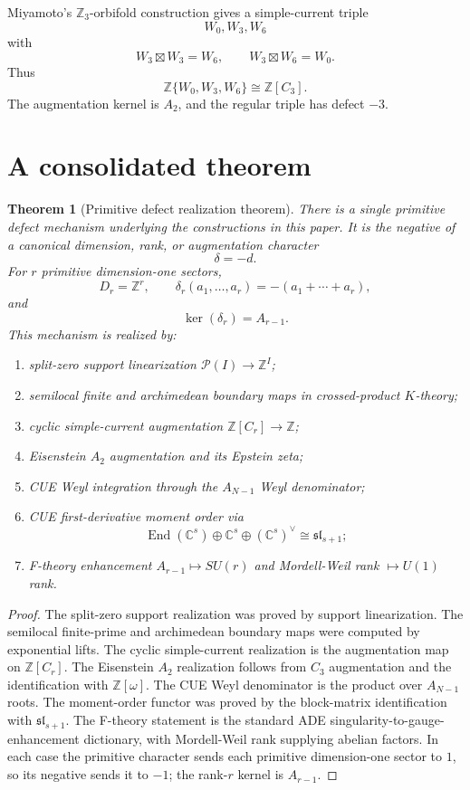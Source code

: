 \documentclass[11pt]{article}
\newtheorem{theorem}{Theorem}[section]
\DeclareMathOperator{\End}{End}
\newcommand{\ZZ}{\mathbb Z}
\newcommand{\CC}{\mathbb C}
\begin{document}
Miyamoto's $\ZZ_3$-orbifold construction gives a simple-current triple
\[
        W_0,W_3,W_6
\]
with
\[
        W_3\boxtimes W_3=W_6,
        \qquad
        W_3\boxtimes W_6=W_0.
\]
Thus
\[
        \ZZ\{W_0,W_3,W_6\}\cong\ZZ[C_3].
\]
The augmentation kernel is $A_2$, and the regular triple has defect $-3$.

\section{A consolidated theorem}

\begin{theorem}[Primitive defect realization theorem]
There is a single primitive defect mechanism underlying the constructions in this paper.  It is the negative of a canonical dimension, rank, or augmentation character
\[
        \delta=-d.
\]
For $r$ primitive dimension-one sectors,
\[
        D_r=\ZZ^r,
        \qquad
        \delta_r(a_1,\ldots,a_r)=-(a_1+\cdots+a_r),
\]
and
\[
        \ker(\delta_r)=A_{r-1}.
\]
This mechanism is realized by:
\begin{enumerate}[label=(\roman*)]
\item split-zero support linearization $\mathcal P(I)\to\ZZ^I$;
\item semilocal finite and archimedean boundary maps in crossed-product $K$-theory;
\item cyclic simple-current augmentation $\ZZ[C_r]\to\ZZ$;
\item Eisenstein $A_2$ augmentation and its Epstein zeta;
\item CUE Weyl integration through the $A_{N-1}$ Weyl denominator;
\item CUE first-derivative moment order via
\[
        \End(\CC^s)\oplus\CC^s\oplus(\CC^s)^\vee\cong\mathfrak{sl}_{s+1};
\]
\item F-theory enhancement $A_{r-1}\mapsto SU(r)$ and Mordell-Weil rank $\mapsto U(1)$ rank.
\end{enumerate}
\end{theorem}

\begin{proof}
The split-zero support realization was proved by support linearization.  The semilocal finite-prime and archimedean boundary maps were computed by exponential lifts.  The cyclic simple-current realization is the augmentation map on $\ZZ[C_r]$.  The Eisenstein $A_2$ realization follows from $C_3$ augmentation and the identification with $\ZZ[\omega]$.  The CUE Weyl denominator is the product over $A_{N-1}$ roots.  The moment-order functor was proved by the block-matrix identification with $\mathfrak{sl}_{s+1}$.  The F-theory statement is the standard ADE singularity-to-gauge-enhancement dictionary, with Mordell-Weil rank supplying abelian factors.  In each case the primitive character sends each primitive dimension-one sector to $1$, so its negative sends it to $-1$; the rank-$r$ kernel is $A_{r-1}$.
\end{proof}
\end{document}

